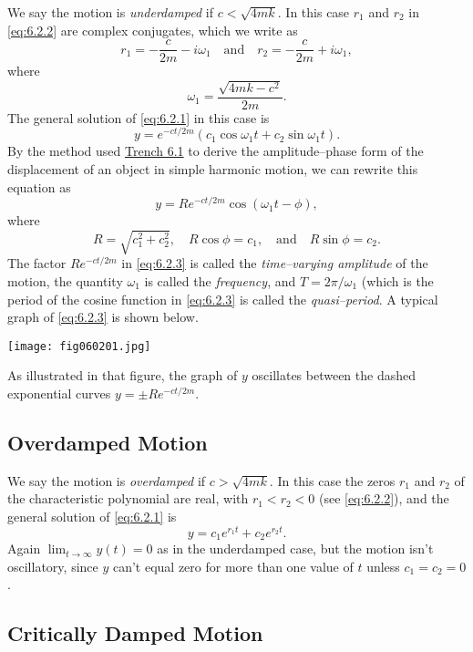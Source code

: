 \documentclass{ximera}
\begin{document}
We say the motion is \textit{underdamped} if $c<\sqrt{4mk}$. In this
case $r_1$ and $r_2$ in \eqref{eq:6.2.2} are complex conjugates, which we
write as
$$
r_1=-\frac{c}{2m}-i\omega_1\quad\mbox{and}\quad
r_2=-\frac{c}{2m}+i\omega_1,
$$
where
$$
\omega_1=\frac{\sqrt{4mk-c^2}}{2m}.
$$
The general solution of  \eqref{eq:6.2.1} in this case is
$$
y=e^{-ct/2m}(c_1\cos\omega_1 t+c_2\sin\omega_1 t).
$$
By the method used \href{https://ximera.osu.edu/ode/main/springProblemsI/springProblemsI}{Trench 6.1}
to derive the
amplitude--phase form of the displacement of an object in simple
harmonic motion, we can rewrite this equation as
\begin{equation}\label{eq:6.2.3}
y=Re^{-ct/2m}\cos(\omega_1 t-\phi),
\end{equation}
 where
$$
R=\sqrt{c_1^2+c_2^2},\quad R\cos\phi=c_1,\quad\mbox{and}\quad R\sin\phi=c_2.
$$
The factor $Re^{-ct/2m}$ in \eqref{eq:6.2.3} is called the \textit{time--varying amplitude} of the motion, the quantity $\omega_1$ is
called the \textit{frequency}, and $T=2\pi/\omega_1$ (which is the
period of the cosine function in \eqref{eq:6.2.3} is called the \textit{quasi--period}. A typical graph of \eqref{eq:6.2.3} is shown below.
 
\begin{image}
  \texttt{[image: fig060201.jpg]}
\end{image}
 
As illustrated in that figure, the graph of $y$
oscillates between the dashed exponential curves $y=\pm Re^{-ct/2m}$.
 
\subsection*{Overdamped Motion}
 
We say the motion is \textit{overdamped} if $c>\sqrt{4mk}$. In this
case the zeros $r_1$ and $r_2$ of the characteristic polynomial are
real, with $r_1<r_2<0$ (see \eqref{eq:6.2.2}), and the general solution of
\eqref{eq:6.2.1} is
$$
y=c_1e^{r_1t}+c_2e^{r_2t}.
$$
Again $\lim_{t\rightarrow\infty}y(t)=0$ as in the
underdamped case, but the motion isn't  oscillatory, since $y$ can't
equal zero for more than one value of $t$ unless $c_1=c_2=0$.
 
\subsection*{Critically Damped Motion}
 
\end{document}
